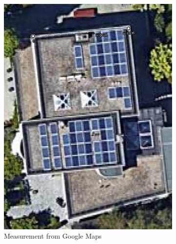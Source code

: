\begin{figure}[H]
\begin{subfigure}[t]{.3\textwidth}
	\includegraphics[width=0.9\linewidth]{images/house_google_maps}
	\caption{Measurement from Google Maps}
	\label{fig:house_google_maps}
\end{subfigure} \quad
\begin{subfigure}[t]{.3\textwidth}
	\centering

\end{subfigure}
\end{figure}
